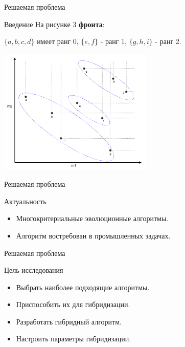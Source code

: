 \documentclass[table]{beamer}
\begin{document}
\begin{frame}{Решаемая проблема}
\begin{block}{Введение}
На рисунке 3 \textbf{фронта}:

$\{a, b, c, d\}$ имеет ранг 0, $\{e, f\}$ - ранг 1, $\{g, h, i\}$ - ранг 2.
\begin{center}
\includegraphics*[height=6cm]{pic/non_dominated_sort.png}
\end{center}
\end{block}
\end{frame}

\begin{frame}{Решаемая проблема}
\begin{block}{Актуальность}
\begin{itemize}
\item Многокритериальные эволюционные алгоритмы.
\item Алгоритм востребован в промышленных задачах.
\end{itemize}
\end{block}
\end{frame}


\begin{frame}{Решаемая проблема}
\begin{block}{Цель исследования}
\begin{itemize}
\item Выбрать наиболее подходящие алгоритмы.
\item Приспособить их для гибридизации.
\item Разработать гибридный алгоритм.
\item Настроить параметры гибридизации.
\end{itemize}
\end{block}
\end{frame}
\end{document}
